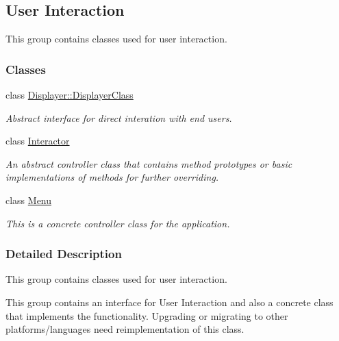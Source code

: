 \hypertarget{group___u_i}{\subsection{User Interaction}
\label{group___u_i}
}


This group contains classes used for user interaction.  


\subsubsection*{Classes}
\begin{DoxyCompactItemize}
\item 
class \hyperlink{class_displayer_1_1_displayer_class}{Displayer\+::\+Displayer\+Class}
\begin{DoxyCompactList}\small\item\em Abstract interface for direct interation with end users. \end{DoxyCompactList}\item 
class \hyperlink{class_interactor}{Interactor}
\begin{DoxyCompactList}\small\item\em An abstract controller class that contains method prototypes or basic implementations of methods for further overriding. \end{DoxyCompactList}\item 
class \hyperlink{class_menu}{Menu}
\begin{DoxyCompactList}\small\item\em This is a concrete controller class for the application. \end{DoxyCompactList}\end{DoxyCompactItemize}


\subsubsection{Detailed Description}
This group contains classes used for user interaction. 

This group contains an interface for User Interaction and also a concrete class that implements the functionality. Upgrading or migrating to other platforms/languages need reimplementation of this class. 